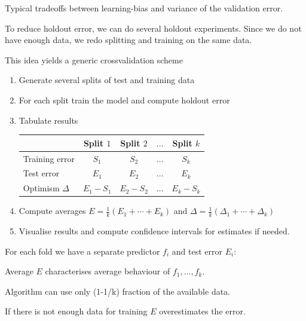 \documentclass[landscape,footrule]{foils}
\begin{document}

\vspace*{-.5cm}
Typical tradeoffs between learning-bias and variance of the validation error.   


\enlargethispage{0.7cm}

To reduce holdout error, we can do several holdout experiments. 
Since we do not have enough data, we redo splitting and training on the same data. 

This idea yields a generic crossvalidation scheme
\begin{enumerate}
\item Generate several splits of test and training data
\item For each split train the model and compute holdout error
\item Tabulate results\vspace*{2ex}
\begin{center}
\begin{tabular}{|l|c|c|c|c|}
\hline
 & Split $1$ & Split $2$ & $\ldots$ & Split $k$\\
 \hline
 Training error & $S_1$ & $S_2$ & $\ldots$ & $S_k$\\
 Test error     & $E_1$ & $E_2$ & $\ldots$ & $E_k$\\
\hline
 Optimism $\Delta$    & $E_1-S_1$ & $E_2-S_2$ & $\ldots$ & $E_k-S_k$\\
 \cline{2-5}
\hline
\end{tabular}
\end{center}
\vspace*{2ex}
\item Compute averages $E=\frac{1}{k}(E_1+\cdots+E_k)$ and $\Delta=\frac{1}{k}(\Delta_1+\cdots+\Delta_k)$
\item Visualise results and compute confidence intervals for estimates if needed. 
\end{enumerate}

\foilhead[-1cm]{}



For each fold we have a separate predictor $f_i$ and test error $E_i$:
\begin{triangles}
\item Average $E$ characterises average behaviour of $f_1,\ldots, f_k$.
\item Algorithm can use only (1-1/k) fraction of the available data.
\item If there is not enough data for training $E$ overestimates the error. \vspace*{1cm}  
\end{triangles}
\end{document}
